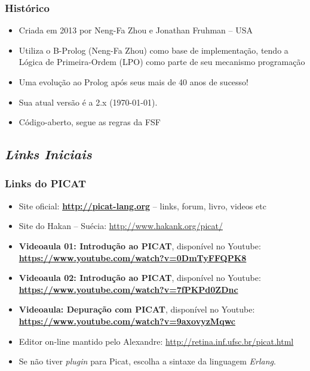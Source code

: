 \begin{frame}

    \frametitle{Histórico}

    \begin{itemize}
      \item Criada em 2013 por Neng-Fa Zhou e Jonathan Fruhman -- USA

      \item Utiliza o B-Prolog (Neng-Fa Zhou) como base de implementação, tendo
      a Lógica de Primeira-Ordem (LPO) como parte de seu mecanismo programação

\pause
      \item Uma evolução ao Prolog após seus mais de 40 anos de sucesso!

\pause
      \item Sua atual versão é a 2.x (\today).
\pause
      \item Código-aberto, segue as regras da FSF

    \end{itemize}
\end{frame}


\subsection{\textit{Links Iniciais}}
\begin{frame}[fragile]
  \frametitle{Links do PICAT}

  \begin{itemize}
   	\item Site oficial: \textbf{\textcolor{violet}{\url{http://picat-lang.org}}} -- links, forum, livro, videos etc

   	\item Site do Hakan -- Suécia:  \url{http://www.hakank.org/picat/}

  \item   \textbf{Videoaula 01: Introdução ao PICAT}, disponível no Youtube:\\
    \textbf{\url {https://www.youtube.com/watch?v=0DmTyFFQPK8}}

   \item   \textbf{Videoaula 02: Introdução ao PICAT}, disponível no Youtube:\\
  \textbf{\url {https://www.youtube.com/watch?v=7fPKPd0ZDnc}}

   \item   \textbf{Videoaula: Depuração com PICAT}, disponível no Youtube:\\
  \textbf{\url {https://www.youtube.com/watch?v=9axovyzMqwc}}

    
   	\item Editor on-line mantido pelo Alexandre: \url{http://retina.inf.ufsc.br/picat.html}
     
    
    \item Se não tiver \textit{plugin} para Picat, escolha a sintaxe da linguagem \textit{Erlang}.
    
  \end{itemize}

\end{frame}


